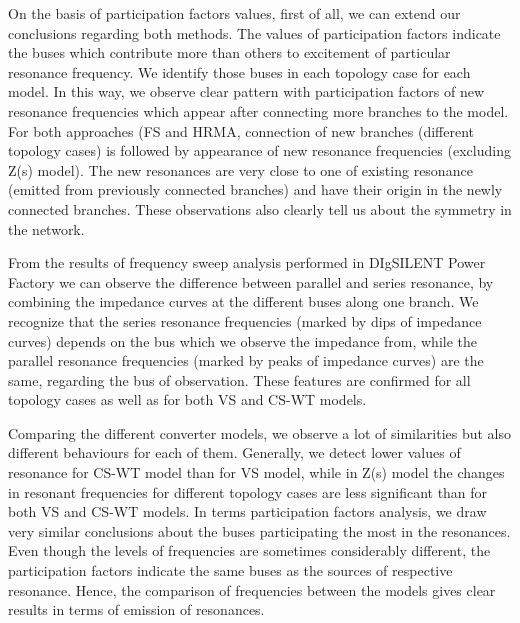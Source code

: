 \documentclass[a4paper,11pt,twoside,openright]{report}
\begin{document}
On the basis of participation factors values, first of all, we can extend our conclusions regarding both methods. The values of participation factors indicate the buses which contribute more than others to excitement of particular resonance frequency. We identify those buses in each topology case for each model. In this way, we observe clear pattern with participation factors of new resonance frequencies which appear after connecting more branches to the model. For both approaches (FS and HRMA, connection of new branches (different topology cases) is followed by appearance of new resonance frequencies (excluding Z(s) model). The new resonances are very close to one of existing resonance (emitted from previously connected branches) and have their origin in the newly connected branches. These observations also clearly tell us about the symmetry in the network.

From the results of frequency sweep analysis performed in DIgSILENT Power Factory we can observe the difference between parallel and series resonance, by combining the impedance curves at the different buses along one branch. We recognize that the series resonance frequencies (marked by dips of impedance curves) depends on the bus which we observe the impedance from, while the parallel resonance frequencies (marked by peaks of impedance curves) are the same, regarding the bus of observation. These features are confirmed for all topology cases as well as for both VS and CS-WT models.

Comparing the different converter models, we observe a lot of similarities but also different behaviours for each of them. Generally, we detect lower values of resonance for CS-WT model than for VS model, while in Z(s) model the changes in resonant frequencies for different topology cases are less significant than for both VS and CS-WT models. In terms participation factors analysis, we draw very similar conclusions about the buses participating the most in the resonances. Even though the levels of frequencies are sometimes considerably different, the participation factors indicate the same buses as the sources of respective resonance. Hence, the comparison of frequencies between the models gives clear results in terms of emission of resonances.
\end{document}
